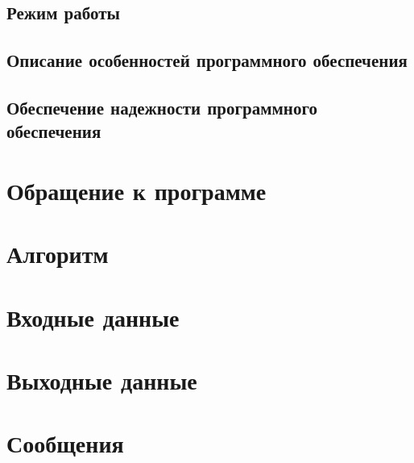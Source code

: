 \subsection{Режим работы}

\subsection{Описание особенностей программного обеспечения}

\subsection{Обеспечение надежности программного обеспечения}

\section{Обращение к программе}

\section{Алгоритм}


\section{Входные данные}

\section{Выходные данные}

\section{Сообщения}




